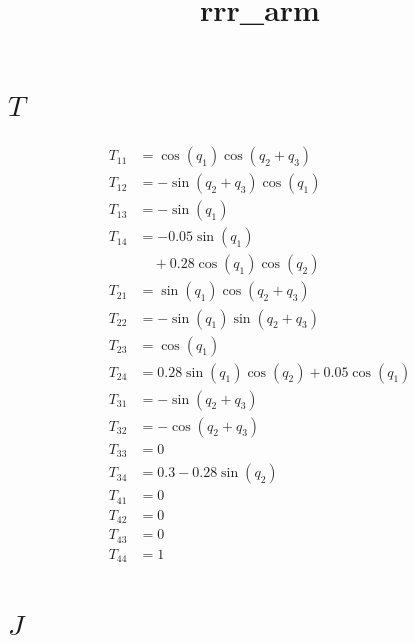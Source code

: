 \documentclass[11pt]{article}
\title{rrr\_arm}
\date{}
\begin{document}
\maketitle


\section*{$T$}

\begin{align*}
T_{11} &= \cos{\left(q_{1} \right)} \cos{\left(q_{2} + q_{3} \right)} \\
T_{12} &= - \sin{\left(q_{2} + q_{3} \right)} \cos{\left(q_{1} \right)} \\
T_{13} &= - \sin{\left(q_{1} \right)} \\
T_{14} &= - 0.05 \sin{\left(q_{1} \right)} \\
&\quad + 0.28 \cos{\left(q_{1} \right)} \cos{\left(q_{2} \right)} \\
T_{21} &= \sin{\left(q_{1} \right)} \cos{\left(q_{2} + q_{3} \right)} \\
T_{22} &= - \sin{\left(q_{1} \right)} \sin{\left(q_{2} + q_{3} \right)} \\
T_{23} &= \cos{\left(q_{1} \right)} \\
T_{24} &= 0.28 \sin{\left(q_{1} \right)} \cos{\left(q_{2} \right)} + 0.05 \cos{\left(q_{1} \right)} \\
T_{31} &= - \sin{\left(q_{2} + q_{3} \right)} \\
T_{32} &= - \cos{\left(q_{2} + q_{3} \right)} \\
T_{33} &= 0 \\
T_{34} &= 0.3 - 0.28 \sin{\left(q_{2} \right)} \\
T_{41} &= 0 \\
T_{42} &= 0 \\
T_{43} &= 0 \\
T_{44} &= 1
\end{align*}


\section*{$J$}
\end{document}
